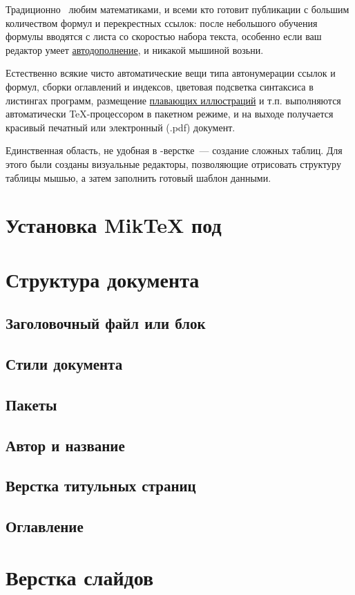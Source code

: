 Традиционно \latex\ любим математиками, и всеми кто готовит публикации с большим
количеством формул и перекрестных ссылок: после небольшого обучения формулы
вводятся с листа со скоростью набора текста, особенно если ваш редактор умеет
\hyperref[autocomplition]{автодополнение}, и никакой мышиной возьни.

Естественно всякие чисто автоматические вещи типа автонумерации ссылок и формул,
сборки оглавлений и индексов, цветовая подсветка синтаксиса в листингах
программ, размещение \hyperref[floatfig]{плавающих иллюстраций} и т.п.
выполняются автоматически \TeX-процессором в пакетном режиме, и на выходе
получается красивый печатный или электронный (.pdf) документ.

Единственная область, не удобная в \latex-верстке\ --- создание сложных таблиц.
Для этого были созданы визуальные редакторы, позволяющие отрисовать структуру
таблицы мышью, а затем заполнить готовый шаблон данными.

\section{Установка MikTeX под \win}
\section{Структура документа}
\subsection{Заголовочный файл или блок}
\subsection{Стили документа}
\subsection{Пакеты}
\subsection{Автор и название}
\subsection{Верстка титульных страниц}
\subsection{Оглавление}
\section{Верстка слайдов}

